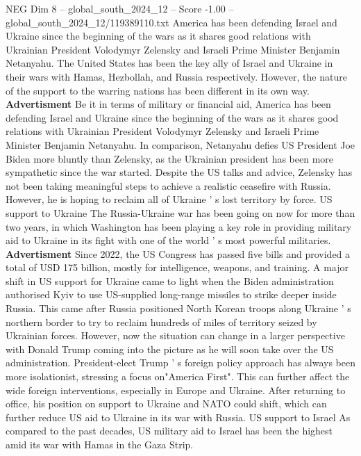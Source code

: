 \begin{textsample}{NEG Dim 8 – global\_south\_2024\_12 – Score -1.00 – global\_south\_2024\_12/119389110.txt}  \label{ex:f8_neg_103}
America has been defending Israel and Ukraine since the beginning of the wars as it shares good relations with Ukrainian President Volodymyr Zelensky and Israeli Prime Minister Benjamin Netanyahu.
The United States has been the key ally of Israel and Ukraine in their wars with Hamas, Hezbollah, and Russia respectively.
However, the nature of the support to the warring nations has been different in its own way. \textbf{Advertisment} Be it in terms of military or financial aid, America has been defending Israel and Ukraine since the beginning of the wars as it shares good relations with Ukrainian President Volodymyr Zelensky and Israeli Prime Minister Benjamin Netanyahu.
In comparison, Netanyahu defies US President Joe Biden more bluntly than Zelensky, as the Ukrainian president has been more sympathetic since the war started.
Despite the US talks and advice, Zelensky has not been taking meaningful steps to achieve a realistic ceasefire with Russia.
However, he is hoping to reclaim all of Ukraine ' s lost territory by force.
US support to Ukraine The Russia-Ukraine war has been going on now for more than two years, in which Washington has been playing a key role in providing military aid to Ukraine in its fight with one of the world ' s most powerful militaries. \textbf{Advertisment} Since 2022, the US Congress has passed five bills and provided a total of USD 175 billion, mostly for intelligence, weapons, and training.
A major shift in US support for Ukraine came to light when the Biden administration authorised Kyiv to use US-supplied long-range missiles to strike deeper inside Russia.
This came after Russia positioned North Korean troops along Ukraine ' s northern border to try to reclaim hundreds of miles of territory seized by Ukrainian forces.
However, now the situation can change in a larger perspective with Donald Trump coming into the picture as he will soon take over the US administration.
President-elect Trump ' s foreign policy approach has always been more isolationist, stressing a focus on"America First".
This can further affect the wide foreign interventions, especially in Europe and Ukraine.
After returning to office, his position on support to Ukraine and NATO could shift, which can further reduce US aid to Ukraine in its war with Russia.
US support to Israel As compared to the past decades, US military aid to Israel has been the highest amid its war with Hamas in the Gaza Strip.

\end{textsample}
